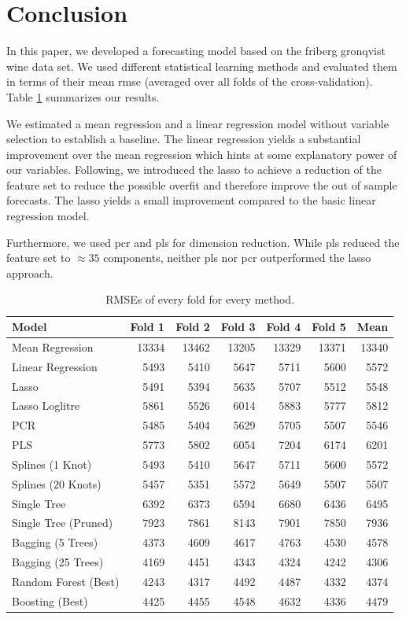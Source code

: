 \documentclass[11pt,]{article}
\begin{document}
\hypertarget{conclusion}{%
\section{Conclusion}\label{conclusion}}

In this paper, we developed a forecasting model based on the friberg
gronqvist wine data set. We used different statistical learning methods
and evaluated them in terms of their mean \ac{rmse} (averaged over all
folds of the cross-validation). Table \ref{tab:RMSESum} summarizes our
results.

We estimated a mean regression and a linear regression model without
variable selection to establish a baseline. The linear regression yields
a substantial improvement over the mean regression which hints at some
explanatory power of our variables. Following, we introduced the
\ac{lasso} to achieve a reduction of the feature set to reduce the
possible overfit and therefore improve the out of sample forecasts. The
lasso yields a small improvement compared to the basic linear regression
model.

Furthermore, we used \ac{pcr} and \ac{pls} for dimension reduction.
While \ac{pls} reduced the feature set to \(\approx35\) components,
neither \ac{pls} nor \ac{pcr} outperformed the \ac{lasso} approach.

\begin{table}[t]

\caption{\label{tab:RMSE}\label{tab:RMSESum}RMSEs of every fold for every method.}
\centering
\begin{tabular}{lrrrrrr}
\toprule
Model & Fold 1 & Fold 2 & Fold 3 & Fold 4 & Fold 5 & Mean\\
\midrule
Mean Regression & 13334 & 13462 & 13205 & 13329 & 13371 & 13340\\
Linear Regression & 5493 & 5410 & 5647 & 5711 & 5600 & 5572\\
Lasso & 5491 & 5394 & 5635 & 5707 & 5512 & 5548\\
Lasso Loglitre & 5861 & 5526 & 6014 & 5883 & 5777 & 5812\\
PCR & 5485 & 5404 & 5629 & 5705 & 5507 & 5546\\
\addlinespace
PLS & 5773 & 5802 & 6054 & 7204 & 6174 & 6201\\
Splines (1 Knot) & 5493 & 5410 & 5647 & 5711 & 5600 & 5572\\
Splines (20 Knots) & 5457 & 5351 & 5572 & 5649 & 5507 & 5507\\
Single Tree & 6392 & 6373 & 6594 & 6680 & 6436 & 6495\\
Single Tree (Pruned) & 7923 & 7861 & 8143 & 7901 & 7850 & 7936\\
\addlinespace
Bagging (5 Trees) & 4373 & 4609 & 4617 & 4763 & 4530 & 4578\\
Bagging (25 Trees) & 4169 & 4451 & 4343 & 4324 & 4242 & 4306\\
Random Forest (Best) & 4243 & 4317 & 4492 & 4487 & 4332 & 4374\\
Boosting (Best) & 4425 & 4455 & 4548 & 4632 & 4336 & 4479\\
\bottomrule
\end{tabular}
\end{table}
\end{document}
